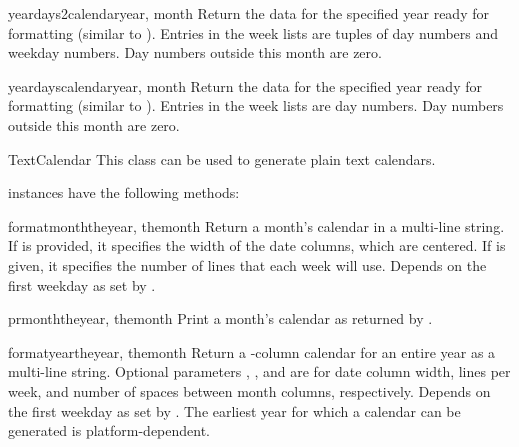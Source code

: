 \begin{methoddesc}{yeardays2calendar}{year, month}
Return the data for the specified year ready for formatting (similar to
). Entries in the week lists are tuples of
day numbers and weekday numbers. Day numbers outside this month are zero.
\end{methoddesc}

\begin{methoddesc}{yeardayscalendar}{year, month}
Return the data for the specified year ready for formatting (similar to
). Entries in the week lists are day numbers.
Day numbers outside this month are zero.
\end{methoddesc}


\begin{classdesc}{TextCalendar}{}
This class can be used to generate plain text calendars.

\end{classdesc}

 instances have the following methods:

\begin{methoddesc}{formatmonth}{theyear, themonth}
Return a month's calendar in a multi-line string. If  is
provided, it specifies the width of the date columns, which are
centered. If  is given, it specifies the number of lines that
each week will use. Depends on the first weekday as set by
.
\end{methoddesc}

\begin{methoddesc}{prmonth}{theyear, themonth}
Print a month's calendar as returned by .
\end{methoddesc}

\begin{methoddesc}{formatyear}{theyear, themonth}
Return a -column calendar for an entire year as a multi-line string.
Optional parameters , , and  are for date column
width, lines per week, and number of spaces between month columns,
respectively. Depends on the first weekday as set by
.  The earliest year for which a calendar can
be generated is platform-dependent.
\end{methoddesc}

